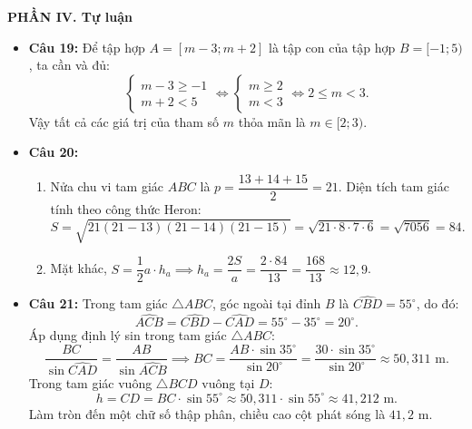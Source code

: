 \documentclass[12pt,a4paper]{article}
\begin{document}
\vspace{0.2cm}
\textbf{PHẦN IV. Tự luận}
\begin{itemize}[leftmargin=0.6cm, itemsep=4pt]
    \item \textbf{Câu 19:}
    Để tập hợp $A = [m - 3; m + 2]$ là tập con của tập hợp $B = [-1; 5)$, ta cần và đủ:
    \[
    \begin{cases}
    m - 3 \ge -1 \\
    m + 2 < 5
    \end{cases}
    \iff
    \begin{cases}
    m \ge 2 \\
    m < 3
    \end{cases}
    \iff 2 \le m < 3.
    \]
    Vậy tất cả các giá trị của tham số $m$ thỏa mãn là $m \in [2; 3)$.

    \item \textbf{Câu 20:}
    \begin{enumerate}
        \item Nửa chu vi tam giác $ABC$ là $p = \dfrac{13 + 14 + 15}{2} = 21$.
        Diện tích tam giác tính theo công thức Heron:
        \[
        S = \sqrt{21(21 - 13)(21 - 14)(21 - 15)} = \sqrt{21 \cdot 8 \cdot 7 \cdot 6} = \sqrt{7056} = 84.
        \]
        \item Mặt khác, $S = \dfrac{1}{2} a \cdot h_a \implies h_a = \dfrac{2S}{a} = \dfrac{2 \cdot 84}{13} = \dfrac{168}{13} \approx 12{,}9$.
    \end{enumerate}

    \item \textbf{Câu 21:}
    Trong tam giác $\triangle ABC$, góc ngoài tại đỉnh $B$ là $\widehat{CBD} = 55^\circ$, do đó:
    \[
    \widehat{ACB} = \widehat{CBD} - \widehat{CAD} = 55^\circ - 35^\circ = 20^\circ.
    \]
    Áp dụng định lý sin trong tam giác $\triangle ABC$:
    \[
    \dfrac{BC}{\sin \widehat{CAD}} = \dfrac{AB}{\sin \widehat{ACB}} \implies BC = \dfrac{AB \cdot \sin 35^\circ}{\sin 20^\circ} = \dfrac{30 \cdot \sin 35^\circ}{\sin 20^\circ} \approx 50{,}311\text{ m}.
    \]
    Trong tam giác vuông $\triangle BCD$ vuông tại $D$:
    \[
    h = CD = BC \cdot \sin 55^\circ \approx 50{,}311 \cdot \sin 55^\circ \approx 41{,}212\text{ m}.
    \]
    Làm tròn đến một chữ số thập phân, chiều cao cột phát sóng là $41{,}2\text{ m}$.


\end{itemize}
\end{document}
